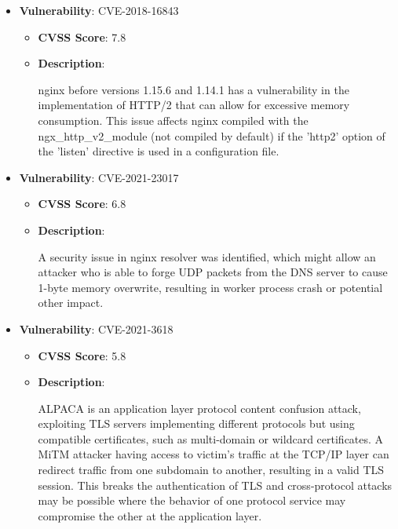 \documentclass{article}
\begin{document}
\begin{itemize}
        \item \textbf{Vulnerability}: CVE-2018-16843
        \begin{itemize}
            \item \textbf{CVSS Score}:  7.8 
            \item \textbf{Description}:
            \parbox[t]{0.9\linewidth}{
                \ttfamily nginx before versions 1.15.6 and 1.14.1 has a vulnerability in the implementation of HTTP/2 that can allow for excessive memory consumption. This issue affects nginx compiled with the ngx\_http\_v2\_module (not compiled by default) if the 'http2' option of the 'listen' directive is used in a configuration file.
            }
        \end{itemize}
    
        \item \textbf{Vulnerability}: CVE-2021-23017
        \begin{itemize}
            \item \textbf{CVSS Score}:  6.8 
            \item \textbf{Description}:
            \parbox[t]{0.9\linewidth}{
                \ttfamily A security issue in nginx resolver was identified, which might allow an attacker who is able to forge UDP packets from the DNS server to cause 1-byte memory overwrite, resulting in worker process crash or potential other impact.
            }
        \end{itemize}
    
        \item \textbf{Vulnerability}: CVE-2021-3618
        \begin{itemize}
            \item \textbf{CVSS Score}:  5.8 
            \item \textbf{Description}:
            \parbox[t]{0.9\linewidth}{
                \ttfamily ALPACA is an application layer protocol content confusion attack, exploiting TLS servers implementing different protocols but using compatible certificates, such as multi-domain or wildcard certificates. A MiTM attacker having access to victim's traffic at the TCP/IP layer can redirect traffic from one subdomain to another, resulting in a valid TLS session. This breaks the authentication of TLS and cross-protocol attacks may be possible where the behavior of one protocol service may compromise the other at the application layer.
            }
        \end{itemize}
    

\end{itemize}
\end{document}
